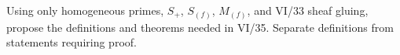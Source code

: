 \begin{problem}\label{chal:vi34-05}
Using only homogeneous primes, \(S_+\), \(S_{(f)}\), \(M_{(f)}\), and VI/33 sheaf gluing, propose the definitions and theorems needed in VI/35. Separate definitions from statements requiring proof.
\end{problem}
